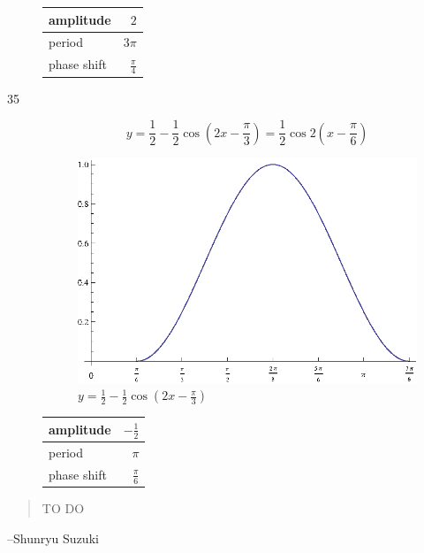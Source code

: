 \documentclass{exam}
\begin{document}
\begin{description}
        \begin{tabular}[H]{lr}
          \toprule
          amplitude & $2$ \\
          \midrule
          period & $3 \pi$ \\
          \midrule
          phase shift & $\frac{\pi}{4}$ \\
          \bottomrule
        \end{tabular}

      \pagebreak

      \item[35]
        \[
          y = \frac{1}{2} - \frac{1}{2} \cos \left( 2x - \frac{\pi}{3} \right) = \frac{1}{2} \cos 2 \left( x - \frac{\pi}{6} \right)
        \]

        \begin{figure}[H]
          \centering
          \includegraphics[scale=1.0]{exercise35.eps}
          \caption{$y = \frac{1}{2} - \frac{1}{2} \cos \left( 2x - \frac{\pi}{3} \right)$}
        \end{figure}

        \begin{tabular}[H]{lr}
          \toprule
          amplitude & $- \frac{1}{2}$ \\
          \midrule
          period & $\pi$ \\
          \midrule
          phase shift & $\frac{\pi}{6}$ \\
          \bottomrule
        \end{tabular}

    \end{description}
  \else
    \vspace{1 cm}
    \begin{quote}
      \begin{em}
        TO DO
      \end{em}
    \end{quote}
    \hspace{1 cm} --Shunryu Suzuki
  \fi
\end{document}
